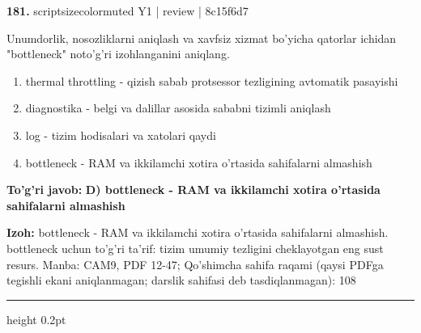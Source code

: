 \documentclass[10pt,a4paper]{article}
\begin{document}
{\bfseries\sffamily\color{ink} 181.} {scriptsizecolor{muted} Y1 | review | 8c15f6d7}
\par
Unumdorlik, nosozliklarni aniqlash va xavfsiz xizmat bo'yicha qatorlar ichidan "bottleneck" noto'g'ri izohlanganini aniqlang.
\begin{enumerate}[label=\Alph*),leftmargin=9mm]
\item thermal throttling - qizish sabab protsessor tezligining avtomatik pasayishi
\item diagnostika - belgi va dalillar asosida sababni tizimli aniqlash
\item log - tizim hodisalari va xatolari qaydi
\item bottleneck - RAM va ikkilamchi xotira o'rtasida sahifalarni almashish
\end{enumerate}
\begin{tcolorbox}[enhanced,breakable,colback=teal!4,colframe=teal!60!black,boxrule=0.45pt,arc=1.2mm,left=2.7mm,right=2.7mm,top=1.8mm,bottom=1.8mm,before skip=2mm,after skip=2mm]
{\bfseries\sffamily\color{teal}To'g'ri javob:} \textbf{D) bottleneck - RAM va ikkilamchi xotira o'rtasida sahifalarni almashish}
\par\smallskip
{\bfseries Izoh:} bottleneck - RAM va ikkilamchi xotira o'rtasida sahifalarni almashish. bottleneck uchun to'g'ri ta'rif: tizim umumiy tezligini cheklayotgan eng sust resurs. Manba: CAM9, PDF 12-47; Qo'shimcha sahifa raqami (qaysi PDFga tegishli ekani aniqlanmagan; darslik sahifasi deb tasdiqlanmagan): 108
\end{tcolorbox}
\vspace{2mm}\hrule height 0.2pt\vspace{3mm}
\end{document}
